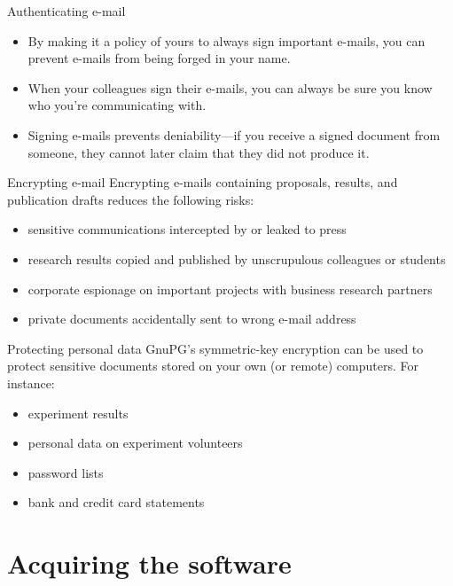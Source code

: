 \documentclass[
mode=present,
paper=smartboard,
size=20pt,
]{powerdot}
\begin{document}
\begin{slide}{Authenticating e-mail}
  \begin{itemize}
  \item By making it a policy of yours to always sign important
    e-mails, you can prevent e-mails from being forged in your name.
  \item When your colleagues sign their e-mails,
    you can always be sure you know who you're communicating with.
  \item Signing e-mails prevents deniability---if you receive a signed
    document from someone, they cannot later claim that they did not
    produce it.
  \end{itemize}
\end{slide}

\begin{slide}{Encrypting e-mail}
  Encrypting e-mails containing proposals, results, and publication
  drafts reduces the following risks:\\[1ex]
  \begin{itemize}
  \item sensitive communications intercepted by or leaked to press
  \item research results copied and published by unscrupulous
    colleagues or students
  \item corporate espionage on important projects with business
    research partners
  \item private documents accidentally sent to wrong e-mail address
  \end{itemize}
\end{slide}

\begin{slide}{Protecting personal data}
  GnuPG's symmetric-key encryption can be used to protect sensitive
  documents stored on your own (or remote) computers.  For instance:\\[1ex]
  \begin{itemize}
  \item experiment results
  \item personal data on experiment volunteers
  \item password lists
  \item bank and credit card statements
  \end{itemize}
\end{slide}


\section{Acquiring the software}
\end{document}
